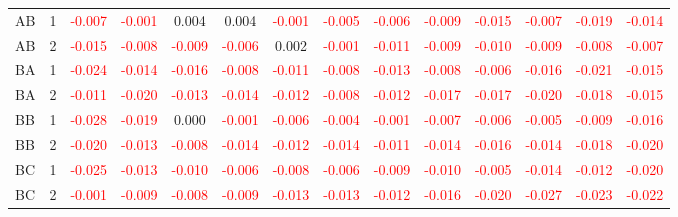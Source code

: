 \begin{table}[H]
{\begin{tabular}{llcccccccccccc}
AB & 1 & \textcolor{red}{-0.007} & \textcolor{red}{-0.001} & 0.004 & 0.004 & \textcolor{red}{-0.001} & \textcolor{red}{-0.005} & \textcolor{red}{-0.006} & \textcolor{red}{-0.009} & \textcolor{red}{-0.015} & \textcolor{red}{-0.007} & \textcolor{red}{-0.019} & \textcolor{red}{-0.014}\\
AB & 2 & \textcolor{red}{-0.015} & \textcolor{red}{-0.008} & \textcolor{red}{-0.009} & \textcolor{red}{-0.006} & 0.002 & \textcolor{red}{-0.001} & \textcolor{red}{-0.011} & \textcolor{red}{-0.009} & \textcolor{red}{-0.010} & \textcolor{red}{-0.009} & \textcolor{red}{-0.008} & \textcolor{red}{-0.007}\\
BA & 1 & \textcolor{red}{-0.024} & \textcolor{red}{-0.014} & \textcolor{red}{-0.016} & \textcolor{red}{-0.008} & \textcolor{red}{-0.011} & \textcolor{red}{-0.008} & \textcolor{red}{-0.013} & \textcolor{red}{-0.008} & \textcolor{red}{-0.006} & \textcolor{red}{-0.016} & \textcolor{red}{-0.021} & \textcolor{red}{-0.015}\\
BA & 2 & \textcolor{red}{-0.011} & \textcolor{red}{-0.020} & \textcolor{red}{-0.013} & \textcolor{red}{-0.014} & \textcolor{red}{-0.012} & \textcolor{red}{-0.008} & \textcolor{red}{-0.012} & \textcolor{red}{-0.017} & \textcolor{red}{-0.017} & \textcolor{red}{-0.020} & \textcolor{red}{-0.018} & \textcolor{red}{-0.015}\\
BB & 1 & \textcolor{red}{-0.028} & \textcolor{red}{-0.019} & 0.000 & \textcolor{red}{-0.001} & \textcolor{red}{-0.006} & \textcolor{red}{-0.004} & \textcolor{red}{-0.001} & \textcolor{red}{-0.007} & \textcolor{red}{-0.006} & \textcolor{red}{-0.005} & \textcolor{red}{-0.009} & \textcolor{red}{-0.016}\\
BB & 2 & \textcolor{red}{-0.020} & \textcolor{red}{-0.013} & \textcolor{red}{-0.008} & \textcolor{red}{-0.014} & \textcolor{red}{-0.012} & \textcolor{red}{-0.014} & \textcolor{red}{-0.011} & \textcolor{red}{-0.014} & \textcolor{red}{-0.016} & \textcolor{red}{-0.014} & \textcolor{red}{-0.018} & \textcolor{red}{-0.020}\\
BC & 1 & \textcolor{red}{-0.025} & \textcolor{red}{-0.013} & \textcolor{red}{-0.010} & \textcolor{red}{-0.006} & \textcolor{red}{-0.008} & \textcolor{red}{-0.006} & \textcolor{red}{-0.009} & \textcolor{red}{-0.010} & \textcolor{red}{-0.005} & \textcolor{red}{-0.014} & \textcolor{red}{-0.012} & \textcolor{red}{-0.020}\\
BC & 2 & \textcolor{red}{-0.001} & \textcolor{red}{-0.009} & \textcolor{red}{-0.008} & \textcolor{red}{-0.009} & \textcolor{red}{-0.013} & \textcolor{red}{-0.013} & \textcolor{red}{-0.012} & \textcolor{red}{-0.016} & \textcolor{red}{-0.020} & \textcolor{red}{-0.027} & \textcolor{red}{-0.023} & \textcolor{red}{-0.022}\\

\end{tabular}}
\end{table}
